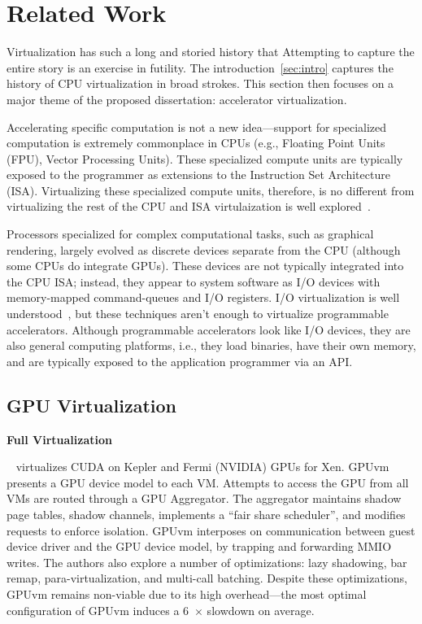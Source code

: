 \section{Related Work}
\label{sec:related}

Virtualization has such a long and storied history that Attempting to capture
the entire story is an exercise in futility. The introduction~\ref{sec:intro}
captures the history of CPU virtualization in broad strokes. This section then
focuses on a major theme of the proposed dissertation:
accelerator virtualization.

Accelerating specific computation is not a new idea---support for specialized
computation is extremely commonplace in CPUs (e.g., Floating Point Units
(FPU), Vector Processing Units). These specialized compute units are
typically exposed to the programmer as extensions to the Instruction Set
Architecture (ISA). Virtualizing these specialized compute units, therefore,
is no different from virtualizing the rest of the CPU and ISA virtulaization
is well explored~\cite{cp40,vm370,popek-goldberg,bugnion-disco,
bugnion-nieh-tsafrir,bugnion-workstation}.

Processors specialized for complex computational tasks, such as graphical
rendering, largely evolved as discrete devices separate from the CPU (although
some CPUs do integrate GPUs). These devices are not typically integrated into
the CPU ISA; instead, they appear to system software as I/O devices with
memory-mapped command-queues and I/O registers. I/O virtualization is well
understood~\cite{waldspurger12cacm,paradice,Kuperman_undated-io,Sig2010-ml,
zeng2013improved,abramson2006intel}, but these techniques aren't enough to
virtualize programmable accelerators. Although programmable accelerators look
like I/O devices, they are also general computing platforms, i.e., they load
binaries, have their own memory, and are typically exposed to the application
programmer via an API.

\subsection{GPU Virtualization}



{\noindent \bf \large Full Virtualization}

~\cite{suzuki2014gpuvm} virtualizes CUDA on Kepler and
Fermi (NVIDIA) GPUs for Xen. GPUvm presents a GPU device model to each VM.
Attempts to access the GPU from all VMs are routed through a GPU Aggregator.
The aggregator maintains shadow page tables, shadow channels, implements a
``fair share scheduler'', and modifies requests to enforce isolation. GPUvm
interposes on communication between guest device driver and the GPU device
model, by trapping and forwarding MMIO writes. The authors also explore a
number of optimizations: lazy shadowing, bar remap, para-virtualization, and
multi-call batching. Despite these optimizations, GPUvm remains non-viable due to its high overhead---the most optimal configuration of GPUvm induces a 6~$\times$ slowdown on average.


